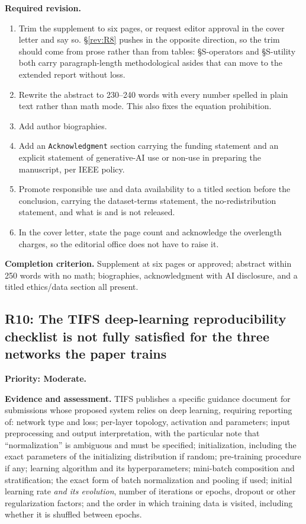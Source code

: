 \documentclass[11pt,a4paper]{article}
\newcommand{\finding}[3]{\subsection{#1: #3}\label{rev:#1}\textbf{Priority: #2.}}
\newcommand{\evidence}{\par\textbf{Evidence and assessment.} }
\newcommand{\action}{\par\textbf{Required revision.} }
\newcommand{\acceptance}{\par\textbf{Completion criterion.} }
\begin{document}
\action
\begin{enumerate}
\item Trim the supplement to six pages, or request editor approval in the cover
  letter and say so. \S\ref{rev:R8} pushes in the opposite direction, so the
  trim should come from prose rather than from tables: \S S-operators and
  \S S-utility both carry paragraph-length methodological asides that can move
  to the extended report without loss.
\item Rewrite the abstract to 230--240 words with every number spelled in plain
  text rather than math mode. This also fixes the equation prohibition.
\item Add author biographies.
\item Add an \texttt{Acknowledgment} section carrying the funding statement and
  an explicit statement of generative-AI use or non-use in preparing the
  manuscript, per IEEE policy.
\item Promote responsible use and data availability to a titled section before
  the conclusion, carrying the dataset-terms statement, the
  no-redistribution statement, and what is and is not released.
\item In the cover letter, state the page count and acknowledge the overlength
  charges, so the editorial office does not have to raise it.
\end{enumerate}

\acceptance
Supplement at six pages or approved; abstract within 250 words with no math;
biographies, acknowledgment with AI disclosure, and a titled ethics/data
section all present.

\finding{R10}{Moderate}{The TIFS deep-learning reproducibility checklist is not
fully satisfied for the three networks the paper trains}

\evidence
TIFS publishes a specific guidance document for submissions whose proposed
system relies on deep learning, requiring reporting of: network type and loss;
per-layer topology, activation and parameters; input preprocessing and output
interpretation, with the particular note that ``normalization'' is ambiguous and
must be specified; initialization, including the exact parameters of the
initializing distribution if random; pre-training procedure if any; learning
algorithm and its hyperparameters; mini-batch composition and stratification;
the exact form of batch normalization and pooling if used; initial learning
rate \emph{and its evolution}, number of iterations or epochs, dropout or other
regularization factors; and the order in which training data is visited,
including whether it is shuffled between epochs.
\end{document}
